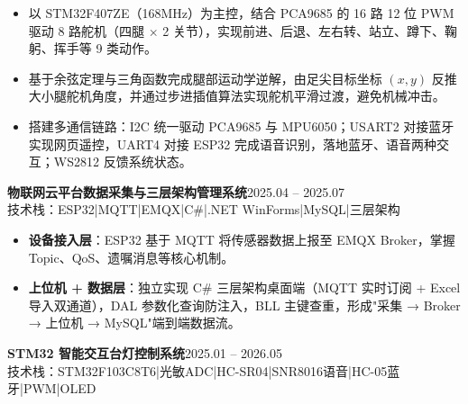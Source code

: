 \documentclass[10pt,a4paper]{article}
\newcommand{\projectblock}[3]{%
    {\bfseries\color{darktext}#1}\hfill{\color{graytext}#2}\\%
    {\small\color{graytext}#3}%
    \vspace{0.2em}%
}
\begin{document}
\begin{itemize}[leftmargin=1.5em, itemsep=2pt, parsep=0pt, topsep=2pt]
    \item 以 STM32F407ZE（168MHz）为主控，结合 PCA9685 的 16 路 12 位 PWM 驱动 8 路舵机（四腿 $\times$ 2 关节），实现前进、后退、左右转、站立、蹲下、鞠躬、挥手等 9 类动作。
    \item 基于余弦定理与三角函数完成腿部运动学逆解，由足尖目标坐标 $(x, y)$ 反推大小腿舵机角度，并通过步进插值算法实现舵机平滑过渡，避免机械冲击。
    \item 搭建多通信链路：I2C 统一驱动 PCA9685 与 MPU6050；USART2 对接蓝牙实现网页遥控，UART4 对接 ESP32 完成语音识别，落地蓝牙、语音两种交互；WS2812 反馈系统状态。
\end{itemize}

\vspace{0.15em}

\projectblock{物联网云平台数据采集与三层架构管理系统}{2025.04 -- 2025.07}{技术栈：ESP32\hspace{0.3em}|\hspace{0.3em}MQTT\hspace{0.3em}|\hspace{0.3em}EMQX\hspace{0.3em}|\hspace{0.3em}C\#\hspace{0.3em}|\hspace{0.3em}.NET WinForms\hspace{0.3em}|\hspace{0.3em}MySQL\hspace{0.3em}|\hspace{0.3em}三层架构}

\begin{itemize}[leftmargin=1.5em, itemsep=2pt, parsep=0pt, topsep=2pt]
    \item \textbf{设备接入层}：ESP32 基于 MQTT 将传感器数据上报至 EMQX Broker，掌握 Topic、QoS、遗嘱消息等核心机制。
    \item \textbf{上位机 + 数据层}：独立实现 C\# 三层架构桌面端（MQTT 实时订阅 + Excel 导入双通道），DAL 参数化查询防注入，BLL 主键查重，形成"采集 → Broker → 上位机 → MySQL"端到端数据流。
\end{itemize}

\vspace{0.15em}

\projectblock{STM32 智能交互台灯控制系统}{2025.01 -- 2026.05}{技术栈：STM32F103C8T6\hspace{0.3em}|\hspace{0.3em}光敏ADC\hspace{0.3em}|\hspace{0.3em}HC-SR04\hspace{0.3em}|\hspace{0.3em}SNR8016语音\hspace{0.3em}|\hspace{0.3em}HC-05蓝牙\hspace{0.3em}|\hspace{0.3em}PWM\hspace{0.3em}|\hspace{0.3em}OLED}
\end{document}

